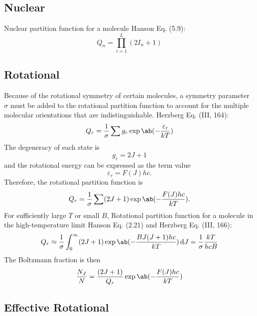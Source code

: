 \documentclass[11pt, twoside, fleqn]{report}
\begin{document}
    \subsection{Nuclear}

    Nuclear partition function for a molecule Hanson Eq. (5.9):
    \begin{equation*}
        Q_{n} = \prod_{i = 1}^{L} (2I_{n} + 1)
    \end{equation*}

    \subsection{Rotational}
    Because of the rotational symmetry of certain molecules, a symmetry parameter $\sigma$ must be added to the rotational partition function to account for the multiple molecular orientations that are indistinguishable.
    Herzberg Eq. (III, 164):
    \begin{equation*}
        Q_{r} = \frac{1}{\sigma} \sum g_{r}\exp\ab(-\frac{\varepsilon_{r}}{kT})
    \end{equation*}
    The degeneracy of each state is
    \begin{equation*}
        g_{r} = 2J + 1
    \end{equation*}
    and the rotational energy can be expressed as the term value
    \begin{equation*}
        \varepsilon_{r} = F(J)hc.
    \end{equation*}
    Therefore, the rotational partition function is
    \begin{equation*}
        Q_{r} = \frac{1}{\sigma} \sum (2J + 1)\exp\ab(-\frac{F(J)hc}{kT}).
    \end{equation*}
    For sufficiently large $T$ or small $B$,
    Rotational partition function for a molecule in the high-temperature limit Hanson Eq. (2.21) and Herzberg Eq. (III, 166):
    \begin{equation*}
        Q_{r} \approx \frac{1}{\sigma} \int_{0}^{\infty} (2J + 1)\exp\ab(-\frac{BJ(J + 1)hc}{kT}) \odif{J} = \frac{1}{\sigma}\frac{kT}{hcB}
    \end{equation*}
    The Boltzmann fraction is then
    \begin{equation*}
        \frac{N_{J}}{N} = \frac{(2J + 1)}{Q_{r}}\exp\ab(-\frac{F(J)hc}{kT})
    \end{equation*}

    \subsection{Effective Rotational}
\end{document}
